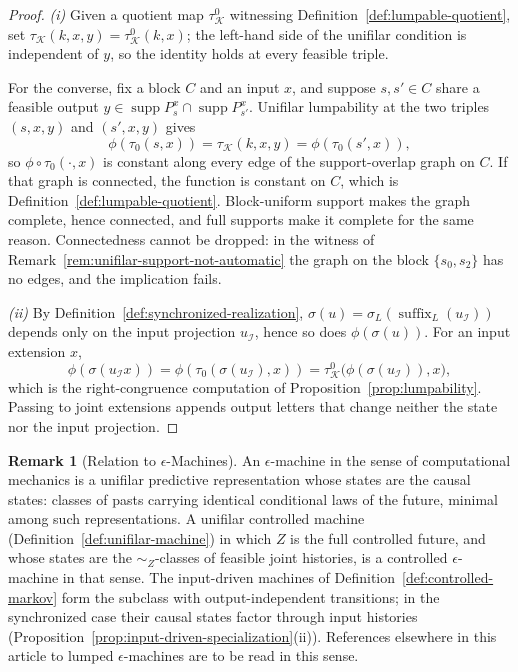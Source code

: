 \documentclass[12pt]{article}
\theoremstyle{definition}
\newtheorem{remark}[theorem]{Remark}
\DeclareMathOperator{\supp}{supp}
\begin{document}
\begin{proof}
\emph{(i)} Given a quotient map $\tau_{\mathcal K}^0$ witnessing
Definition~\ref{def:lumpable-quotient}, set
$\tau_{\mathcal K}(k,x,y)=\tau_{\mathcal K}^0(k,x)$; the left-hand side of the
unifilar condition is independent of $y$, so the identity holds at every
feasible triple.

For the converse, fix a block $C$ and an input $x$, and suppose $s,s'\in C$
share a feasible output $y\in\supp P_s^x\cap\supp P_{s'}^x$.  Unifilar
lumpability at the two triples $(s,x,y)$ and $(s',x,y)$ gives
\[
\phi(\tau_0(s,x))
=
\tau_{\mathcal K}(k,x,y)
=
\phi(\tau_0(s',x)),
\]
so $\phi\circ\tau_0(\cdot,x)$ is constant along every edge of the
support-overlap graph on $C$.  If that graph is connected, the function is
constant on $C$, which is Definition~\ref{def:lumpable-quotient}.
Block-uniform support makes the graph complete, hence connected, and full
supports make it complete for the same reason.  Connectedness cannot be
dropped: in the witness of
Remark~\ref{rem:unifilar-support-not-automatic} the graph on the block
$\{s_0,s_2\}$ has no edges, and the implication fails.

\emph{(ii)} By Definition~\ref{def:synchronized-realization},
$\sigma(u)=\sigma_L(\operatorname{suffix}_L(u_{\mathcal I}))$ depends only on
the input projection $u_{\mathcal I}$, hence so does $\phi(\sigma(u))$.  For an
input extension $x$,
\[
\phi(\sigma(u_{\mathcal I}x))
=
\phi(\tau_0(\sigma(u_{\mathcal I}),x))
=
\tau_{\mathcal K}^0\bigl(\phi(\sigma(u_{\mathcal I})),x\bigr),
\]
which is the right-congruence computation of
Proposition~\ref{prop:lumpability}.  Passing to joint extensions appends
output letters that change neither the state nor the input projection.
\end{proof}

\begin{remark}[Relation to $\epsilon$-Machines]
\label{rem:epsilon-machine-relation}
An $\epsilon$-machine in the sense of computational mechanics
\cite{shalizi2001} is a unifilar predictive representation whose states are
the causal states: classes of pasts carrying identical conditional laws of the
future, minimal among such representations.  A unifilar controlled machine
(Definition~\ref{def:unifilar-machine}) in which $Z$ is the full controlled
future, and whose states are the $\sim_Z$-classes of feasible joint histories,
is a controlled $\epsilon$-machine in that sense.  The input-driven machines of
Definition~\ref{def:controlled-markov} form the subclass with
output-independent transitions; in the synchronized case their causal states
factor through input histories
(Proposition~\ref{prop:input-driven-specialization}(ii)).  References
elsewhere in this article to lumped $\epsilon$-machines are to be read in this
sense.
\end{remark}
\end{document}
